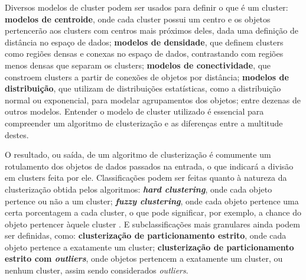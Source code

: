 \documentclass[12pt, %
openright, 
oneside, %
a4paper,    %
brazil]{facom-ufu-abntex2}
\begin{document}


Diversos modelos de cluster podem ser usados para definir o que é um cluster: \textbf{modelos de centroide}, onde cada cluster possui um centro e os objetos pertencerão aos clusters com centros mais próximos deles, dada uma definição de distância no espaço de dados; \textbf{modelos de densidade}, que definem clusters como regiões densas e conexas no espaço de dados, contrastando com regiões menos densas que separam os clusters; \textbf{modelos de conectividade}, que constroem clusters a partir de conexões de objetos por distância; \textbf{modelos de distribuição}, que utilizam de distribuições estatísticas, como a distribuição normal ou exponencial, para modelar agrupamentos dos objetos; entre dezenas de outros modelos. Entender o modelo de cluster utilizado é essencial para compreender um algoritmo de clusterização e as diferenças entre a multitude destes.


O resultado, ou saída, de um algoritmo de clusterização é comumente um rotulamento dos objetos de dados passados na entrada, o que indicará a divisão em clusters feita por ele. Classificações podem ser feitas quanto à natureza da clusterização obtida pelos algoritmos: \textbf{\textit{hard clustering}}, onde cada objeto pertence ou não a um cluster; \textbf{\textit{fuzzy clustering}}, onde cada objeto pertence uma certa porcentagem a cada cluster, o que pode significar, por exemplo, a chance do objeto pertencer àquele cluster \cite{FuzzyClusteringSurvey}. E subclassificações mais granulares ainda podem ser definidas, como: \textbf{clusterização de particionamento estrito}, onde cada objeto pertence a exatamente um cluster; \textbf{clusterização de particionamento estrito com \textit{outliers}}, onde objetos pertencem a exatamente um cluster, ou nenhum cluster, assim sendo considerados \textit{outliers}.



\end{document}
